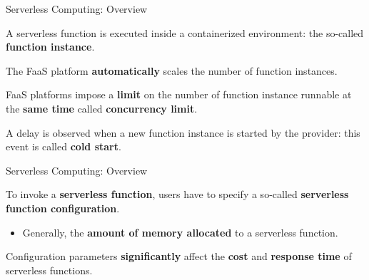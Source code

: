 \documentclass[13.5pt]{beamer}
\newcommand{\B}[1]{\textcolor{TorVergataColor}{\textbf{#1}}}
\begin{document}
\begin{frame}{Serverless Computing: Overview}
	
	\begin{block}{}
		\centering
		A serverless function is executed inside a containerized environment: the so-called \B{function instance}.
	\end{block}

	\vspace{\baselineskip}
	
	\begin{block}{}
		\centering
		The FaaS platform \B{automatically} scales the number of function instances.
	\end{block}

	\vspace{\baselineskip}
	
	\begin{block}{}
		FaaS platforms impose a \B{limit} on the number of function instance runnable at the \B{same time} called \B{concurrency limit}.
	\end{block}

\vspace{\baselineskip}

\begin{block}{}
	A delay is observed when a new function instance is started by the provider: this event is called \B{cold start}.
\end{block}
		
\end{frame} 
\begin{frame}{Serverless Computing: Overview}
	
	\begin{block}{}
		To invoke a \B{serverless function}, users have to specify a so-called \B{serverless function configuration}.
		\begin{itemize}
			\item Generally, the \B{amount of memory allocated} to a serverless function.
		\end{itemize}
	\end{block}
	\vspace{\baselineskip}
	\begin{block}{}
		\centering
		Configuration parameters \B{significantly} affect the \B{cost} and \B{response time} of serverless functions.
	\end{block}
	
	
\end{frame} 
\end{document}

